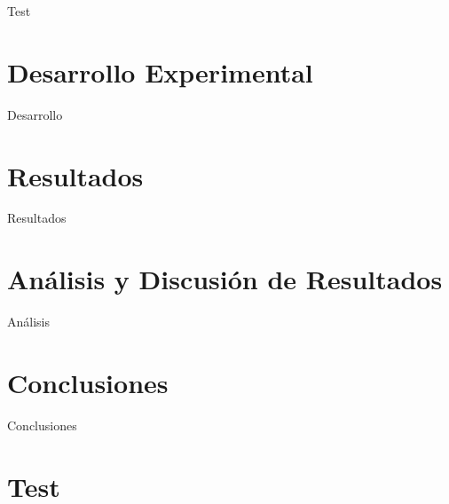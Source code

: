 \documentclass{replab}
\begin{document}
Test    \cite{oda}

	\section{Desarrollo Experimental}

Desarrollo

	\section{Resultados}

Resultados

    \section{Análisis y Discusión de Resultados}

    Análisis

	\section{Conclusiones}

    Conclusiones




  {\list
     {}
     {\setlength{\labelwidth}{\labelnumberwidth}%
      \setlength{\leftmargin}{\labelwidth}%
      \setlength{\labelsep}{\biblabelsep}%
      \addtolength{\leftmargin}{\labelsep}%
      \setlength{\itemsep}{\bibitemsep}%
      \setlength{\parsep}{\bibparsep}}%
      \renewcommand*{\makelabel}[1]{\hss##1}}
  {\endlist}
  {\item}

\printbibliography[heading=bibintoc]

\clearpage

{
\onecolumn
\appendix
{}

\section{Test}

}
\end{document}
